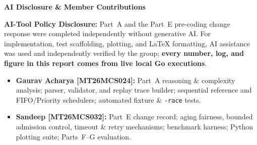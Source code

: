 \documentclass[11pt]{article}
\newcommand{\subhead}[1]{\vspace{0.55em}\noindent\textbf{\large #1}\par\vspace{0.22em}}
\begin{document}
\newpage
\subhead{AI Disclosure \& Member Contributions}
\textbf{AI-Tool Policy Disclosure:} Part~A and the Part~E pre-coding change response were completed independently without generative AI. For implementation, test scaffolding, plotting, and LaTeX formatting, AI assistance was used and independently verified by the group; \textbf{every number, log, and figure in this report comes from live local Go executions}.

\begin{itemize}
    \item \textbf{Gaurav Acharya [MT26MCS024]:} Part~A reasoning \& complexity analysis;  parser, validator, and replay trace builder; sequential reference and FIFO/Priority schedulers; automated fixture \& \texttt{-race} tests.
    \item \textbf{Sandeep [MT26MCS032]:} Part~E change record; aging fairness, bounded admission control, timeout \& retry mechanisms;  benchmark harness; Python plotting suite; Parts~F--G evaluation.
\end{itemize}
\end{document}
